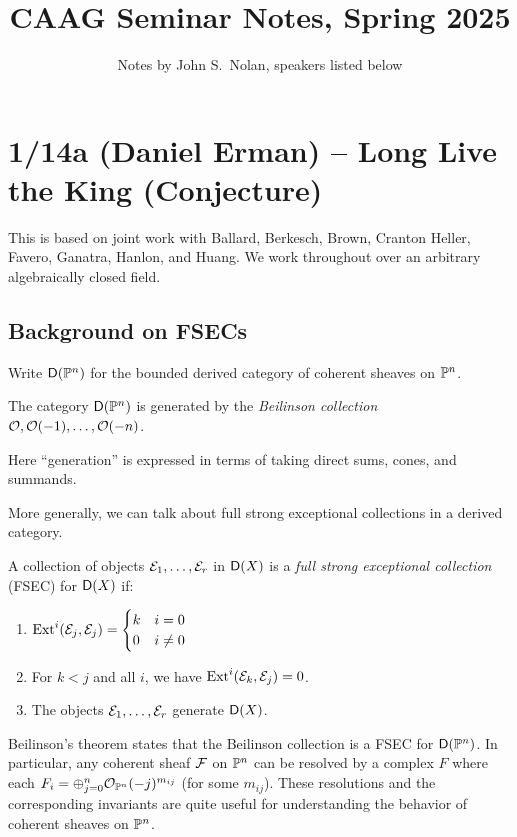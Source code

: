 \documentclass{article}
\title{CAAG Seminar Notes, Spring 2025}
\author{Notes by John S.\ Nolan, speakers listed below}
\begin{document}
\maketitle

\tableofcontents

\pagebreak

\section{1/14a (Daniel Erman) -- Long Live the King (Conjecture)}

This is based on joint work with Ballard, Berkesch, Brown, Cranton Heller, Favero, Ganatra, Hanlon, and Huang.
We work throughout over an arbitrary algebraically closed field.

\subsection{Background on FSECs}

Write $\mathsf{D}(\mathbb{P}^n)$ for the bounded derived category of coherent sheaves on $\mathbb{P}^n$.

\begin{thm}[Beilinson]
	The category $\mathsf{D}(\mathbb{P}^n)$ is generated by the \emph{Beilinson collection} $\mathcal{O}, \mathcal{O}(-1), \dots, \mathcal{O}(-n)$.
\end{thm}

Here ``generation'' is expressed in terms of taking direct sums, cones, and summands.

More generally, we can talk about full strong exceptional collections in a derived category.

\begin{dfn}
	A collection of objects $\mathcal{E}_1, \dots, \mathcal{E}_r$ in $\mathsf{D}(X)$ is a \emph{full strong exceptional collection} (FSEC) for $\mathsf{D}(X)$ if:
	\begin{enumerate}
		\item $\operatorname{Ext}^i(\mathcal{E}_j, \mathcal{E}_j) = \begin{cases}
				k & i = 0 \\
				0 & i \neq 0
			\end{cases}$
		\item For $k < j$ and all $i$, we have $\operatorname{Ext}^i(\mathcal{E}_k, \mathcal{E}_j) = 0$.
		\item The objects $\mathcal{E}_1, \dots, \mathcal{E}_r$ generate $\mathsf{D}(X)$.
	\end{enumerate}
\end{dfn}

Beilinson's theorem states that the Beilinson collection is a FSEC for $\mathsf{D}(\mathbb{P}^n)$.
In particular, any coherent sheaf $\mathcal{F}$ on $\mathbb{P}^n$ can be resolved by a complex $F$ where each $F_i = \oplus_{j=0}^n \mathcal{O}_{\mathbb{P}^n}(-j)^{m_{ij}}$ (for some $m_{ij}$).
These resolutions and the corresponding invariants are quite useful for understanding the behavior of coherent sheaves on $\mathbb{P}^n$.
\end{document}
